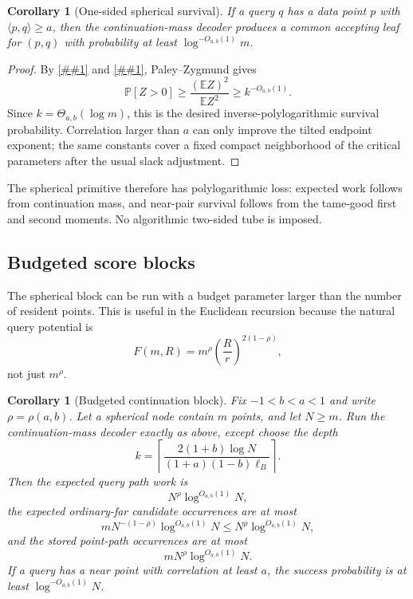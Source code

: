 \documentclass[10pt]{article}
\newcommand{\cref}[1]{\ref{##1}}
\newtheorem{corollary}[theorem]{Corollary}
\theoremstyle{definition}
\newcommand{\E}{\mathbb{E}}
\newcommand{\Prb}{\mathbb{P}}
\newcommand{\ip}[2]{\langle #1,#2\rangle}
\begin{document}
\begin{corollary}[One-sided spherical survival]\label{cor:spherical-survival}
   If a query $q$ has a data point $p$ with $\ip{p}{q}\ge a$, then the continuation-mass decoder produces a common accepting leaf for $(p,q)$ with probability at least $\log^{-O_{a,b}(1)}m$.
\end{corollary}

\begin{proof}
   By \cref{lem:good-first-moment} and \cref{lem:tame-second-moment}, Paley--Zygmund gives
   \[
      \Prb[Z>0]\ge \frac{(\E Z)^2}{\E Z^2}
      \ge k^{-O_{a,b}(1)}.
   \]
   Since $k=\Theta_{a,b}(\log m)$, this is the desired inverse-polylogarithmic survival probability. Correlation larger than $a$ can only improve the tilted endpoint exponent; the same constants cover a fixed compact neighborhood of the critical parameters after the usual slack adjustment.
\end{proof}

The spherical primitive therefore has polylogarithmic loss: expected work follows from continuation mass, and near-pair survival follows from the tame-good first and second moments. No algorithmic two-sided tube is imposed.

\subsection{Budgeted score blocks}

The spherical block can be run with a budget parameter larger than the number of resident points. This is useful in the Euclidean recursion because the natural query potential is
\[
   F(m,R)=m^\rho\left(\frac Rr\right)^{2(1-\rho)},
\]
not just $m^\rho$.

\begin{corollary}[Budgeted continuation block]\label{cor:budgeted-block}
   Fix $-1<b<a<1$ and write $\rho=\rho(a,b)$. Let a spherical node contain $m$ points, and let $N\ge m$. Run the continuation-mass decoder exactly as above, except choose the depth
   \[
      k
      =
      \left\lceil
         \frac{2(1+b)\log N}
         {(1+a)(1-b)\ell_B}
      \right\rceil .
   \]
   Then the expected query path work is
   \[
      N^\rho\log^{O_{a,b}(1)}N,
   \]
   the expected ordinary-far candidate occurrences are at most
   \[
      mN^{-(1-\rho)}\log^{O_{a,b}(1)}N
      \le
      N^\rho\log^{O_{a,b}(1)}N,
   \]
   and the stored point-path occurrences are at most
   \[
      mN^\rho\log^{O_{a,b}(1)}N.
   \]
   If a query has a near point with correlation at least $a$, the success probability is at least $\log^{-O_{a,b}(1)}N$.
\end{corollary}
\end{document}
